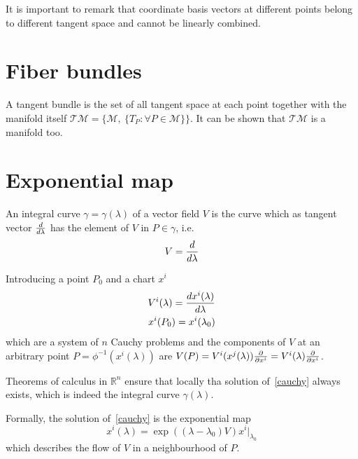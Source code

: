     It is important to remark that coordinate basis vectors at different points belong to different tangent space and cannot be linearly combined.

\section{Fiber bundles}

    A tangent bundle is the set of all tangent space at each point together with the manifold itself $\mathcal T \mathcal M = \{\mathcal M, ~\{T_P \colon \forall P \in \mathcal M \}\}$. It can be shown that $\mathcal T \mathcal M$ is a manifold too.

\section{Exponential map}

    An integral curve $\gamma = \gamma(\lambda)$ of a vector field $V$ is the curve which as tangent vector $\frac{d}{d\lambda}$ has the element of $V$ in $P \in \gamma$, i.e. 
    \begin{equation*}
        V = \frac{d}{d\lambda}
    \end{equation*}

    Introducing a point $P_0$ and a chart $x^i$
    \begin{equation} \label{cauchy}
        \begin{split}
            V^i(\lambda) = \frac{dx^i(\lambda)}{d\lambda} \\
            x^i(P_0) = x^i(\lambda_0)
        \end{split}
    \end{equation}
    which are a system of $n$ Cauchy problems and the components of $V$ at an arbitrary point $ P = \phi^{-1}(x^i(\lambda))$ are $V(P) = V^i(x^j(\lambda)) \frac{\partial}{\partial x^i} = V^i(\lambda) \frac{\partial}{\partial x^i}$. 
    
    Theorems of calculus in $\mathbb R^n$ ensure that locally tha solution of~\eqref{cauchy} always exists, which is indeed the integral curve $\gamma(\lambda)$.

    Formally, the solution of~\eqref{cauchy} is the exponential map
    \begin{equation*}
        x^i(\lambda) = \exp((\lambda - \lambda_0)V) x^i \Big\vert_{\lambda_0}
    \end{equation*}
    which describes the flow of $V$ in a neighbourhood of $P$.

